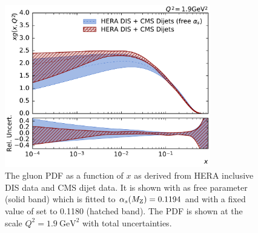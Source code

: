 \begin{figure}[htb]
  \centering
  \includegraphics[width=0.8\textwidth]{figures/pdf_constraints/pdfcomp_direct_alphas_0_1.9.pdf}\hfill%
  \caption[Gluon PDF with free parameter \asmz]{The gluon PDF as a function of
      $x$ as derived from HERA inclusive DIS data and CMS dijet data. It is
      shown with \asmz as free parameter (solid band) which is fitted to
      $\alpha_{s}(M_\mathrm{Z})=0.1194$ and with a fixed value of \asmz set to 0.1180 (hatched
      band). The PDF is
      shown at the scale $Q^2 = \SI{1.9}{\GeV \squared}$ with total
  uncertainties.}
\label{fig:pdfconstraints:direct_freealphas:19}
\end{figure}
